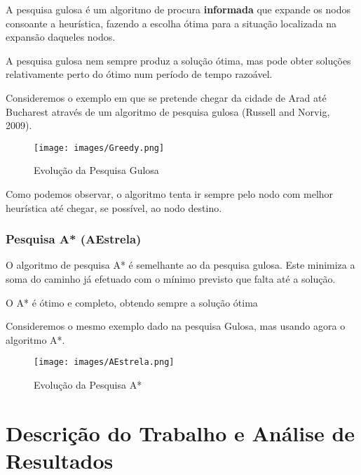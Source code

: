 \documentclass[a4paper,12pt]{report}
\begin{document}
A pesquisa gulosa é um algoritmo de procura \textbf{informada} que expande os nodos consoante a heurística, fazendo a escolha ótima para a situação localizada na expansão daqueles nodos.
\par A pesquisa gulosa nem sempre produz a solução ótima, mas pode obter soluções relativamente perto do ótimo num período de tempo razoável.

\vspace{0.3cm}
\par Consideremos o exemplo em que se pretende chegar da cidade de Arad até Bucharest  através de um algoritmo de pesquisa gulosa (Russell and Norvig, 2009).

\begin{figure}[H]
    \centering
    \texttt{[image: images/Greedy.png]}
    \caption{Evolução da Pesquisa Gulosa}
    \label{fig:Greedy}
\end{figure}

Como podemos observar, o algoritmo tenta ir sempre pelo nodo com melhor heurística até chegar, se possível, ao nodo destino.

\vspace{10cm}

\subsection{Pesquisa A* (AEstrela)}
\label{Pesquisa A* (AEstrela)}

O algoritmo de pesquisa A* é semelhante ao da pesquisa gulosa. Este minimiza a soma do caminho já efetuado com o mínimo previsto que falta até a solução.
\par O A* é ótimo e completo, obtendo sempre a solução ótima

\vspace{0.3cm}
\par Consideremos o mesmo exemplo dado na pesquisa Gulosa, mas usando agora o algoritmo A*.

\begin{figure}[H]
    \centering
    \texttt{[image: images/AEstrela.png]}
    \caption{Evolução da Pesquisa A*}
    \label{fig:AEstrela}
\end{figure}



\chapter{Descrição do Trabalho e Análise de Resultados}
\label{Descrição do Trabalho e Análise de Resultados}
\end{document}
